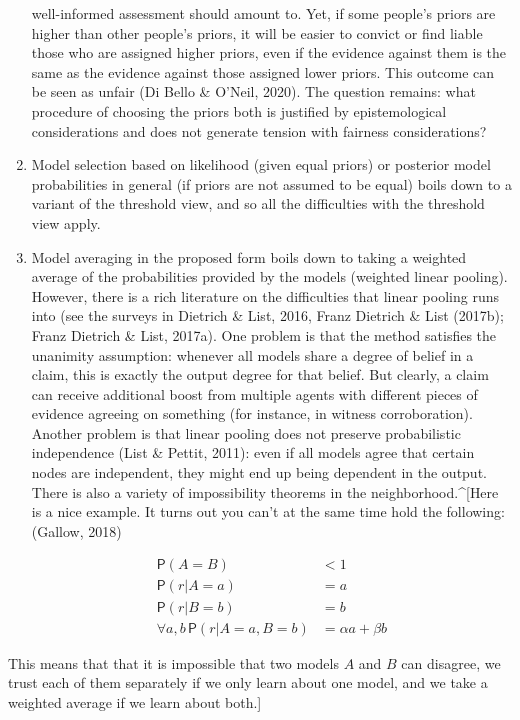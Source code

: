 \documentclass[11pt,dvipsnames,enabledeprecatedfontcommands]{scrartcl}
\newcommand{\pr}[1]{\mathsf{P}(#1)}
\begin{document}
\begin{enumerate}
  well-informed assessment should amount to. Yet, if some people's
  priors are higher than other people's priors, it will be easier to
  convict or find liable those who are assigned higher priors, even if
  the evidence against them is the same as the evidence against those
  assigned lower priors. This outcome can be seen as unfair (Di Bello \&
  O'Neil, 2020). The question remains: what procedure of choosing the
  priors both is justified by epistemological considerations and does
  not generate tension with fairness considerations?
\item
  Model selection based on likelihood (given equal priors) or posterior
  model probabilities in general (if priors are not assumed to be equal)
  boils down to a variant of the threshold view, and so all the
  difficulties with the threshold view apply.
\item
  Model averaging in the proposed form boils down to taking a weighted
  average of the probabilities provided by the models (weighted linear
  pooling). However, there is a rich literature on the difficulties that
  linear pooling runs into (see the surveys in Dietrich \& List, 2016,
  Franz Dietrich \& List (2017b); Franz Dietrich \& List, 2017a). One
  problem is that the method satisfies the unanimity assumption:
  whenever all models share a degree of belief in a claim, this is
  exactly the output degree for that belief. But clearly, a claim can
  receive additional boost from multiple agents with different pieces of
  evidence agreeing on something (for instance, in witness
  corroboration). Another problem is that linear pooling does not
  preserve probabilistic independence (List \& Pettit, 2011): even if
  all models agree that certain nodes are independent, they might end up
  being dependent in the output. There is also a variety of
  impossibility theorems in the neighborhood.\^{}{[}Here is a nice
  example. It turns out you can't at the same time hold the following:
  (Gallow, 2018)

  \begin{align}
  \pr{A=B} & <1\\
  \pr{r\vert A=a} & = a \\
  \pr{r\vert B=b} & = b \\
  \forall a,b \, \pr{r \vert A =a, B = b} & =  \alpha a + \beta b
  \end{align}
\end{enumerate}

\noindent This means that that it is impossible that two models \(A\)
and \(B\) can disagree, we trust each of them separately if we only
learn about one model, and we take a weighted average if we learn about
both.{]}
\end{document}
